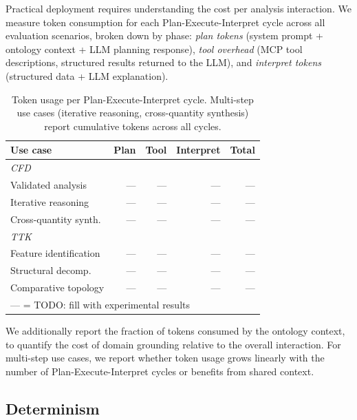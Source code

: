 \documentclass{vgtc}                          %
\begin{document}
Practical deployment requires understanding the cost per analysis interaction.
We measure token consumption for each Plan-Execute-Interpret cycle across all
evaluation scenarios, broken down by phase:
\textit{plan tokens} (system prompt + ontology context + LLM planning response),
\textit{tool overhead} (MCP tool descriptions, structured results returned to
the LLM), and \textit{interpret tokens} (structured data + LLM explanation).

\begin{table}[tb]
  \caption{Token usage per Plan-Execute-Interpret cycle. Multi-step use cases
  (iterative reasoning, cross-quantity synthesis) report cumulative tokens
  across all cycles.}
  \label{tab:tokens}
  \centering
  \scriptsize
  \begin{tabular}{lrrrr}
  \toprule
  \textbf{Use case} & Plan & Tool & Interpret & Total \\
  \midrule
  \multicolumn{5}{l}{\textit{CFD}} \\
  \quad Validated analysis     & --- & --- & --- & --- \\
  \quad Iterative reasoning    & --- & --- & --- & --- \\
  \quad Cross-quantity synth.  & --- & --- & --- & --- \\
  \midrule
  \multicolumn{5}{l}{\textit{TTK}} \\
  \quad Feature identification & --- & --- & --- & --- \\
  \quad Structural decomp.    & --- & --- & --- & --- \\
  \quad Comparative topology   & --- & --- & --- & --- \\
  \bottomrule
  \multicolumn{5}{l}{\scriptsize --- = TODO: fill with experimental results} \\
  \end{tabular}
\end{table}

We additionally report the fraction of tokens consumed by the ontology context,
to quantify the cost of domain grounding relative to the overall interaction.
For multi-step use cases, we report whether token usage grows linearly with
the number of Plan-Execute-Interpret cycles or benefits from shared context.

\subsection{Determinism}
\end{document}
